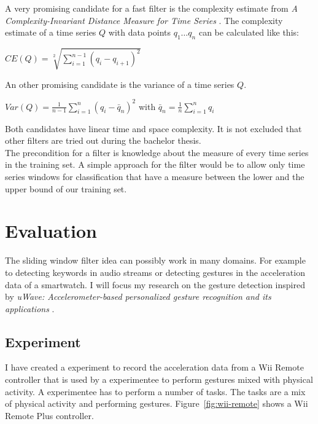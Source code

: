 \documentclass[runningheads,a4paper]{llncs}
\begin{document}
    A very promising candidate for a fast filter is the complexity estimate from
    \textit{A Complexity-Invariant Distance Measure for Time Series} \cite{batista2011complexity}. The complexity
    estimate of a time series $Q$ with data points $q_1 \dots q_n$ can be calculated like this:\\
    \begin{center}
        $CE(Q) = \sqrt[2]{\sum \limits_{i=1}^{n-1} (q_i-q_{i+1})^2}$
    \end{center}

    An other promising candidate is the variance of a time series $Q$.\\
    \begin{center}
        $Var(Q) = \frac{1}{n -1} {\sum \limits_{i=1}^{n} (q_i-\bar{q}_n)^2}$ with
        $\bar{q}_n = \frac{1}{n} {\sum \limits_{i=1}^{n} q_i}$
    \end{center}

    Both candidates have linear time and space complexity. It is not excluded that other filters are tried out during
    the bachelor thesis.\\

    The precondition for a filter is knowledge about the measure of every time series in the training set.
    A simple approach for the filter would be to allow only time series windows for classification that have a
    measure between the lower and the upper bound of our training set.

    \section{Evaluation}
    The sliding window filter idea can possibly work in many domains. For example to detecting keywords in audio
    streams or detecting gestures in the acceleration data of a smartwatch. I will focus my research on the gesture
    detection inspired by
    \textit{uWave: Accelerometer-based personalized gesture recognition and its applications} \cite{liu2009uwave}.

    \subsection{Experiment}
    I have created a experiment to record the acceleration data from a Wii Remote controller that is used by a
    experimentee to perform gestures mixed with physical activity. A experimentee has to perform a number of tasks. The
    tasks are a mix of physical activity and performing gestures. Figure~\ref{fig:wii-remote} shows a Wii Remote Plus
    controller.
\end{document}
